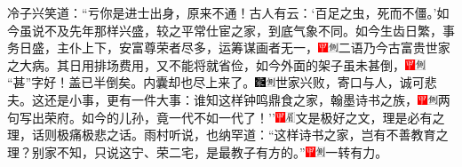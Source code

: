 {冷子兴笑道：``亏你是进士出身，原来不通！古人有云：`百足之虫，死而不僵。'如今虽说不及先年那样兴盛，较之平常仕宦之家，到底气象不同。如今生齿日繁，事务日盛，主仆上下，安富尊荣者尽多，运筹谋画者无一，{\includegraphics[width=3mm]{../Images/00002}\includegraphics[width=3mm]{../Images/00011}\footnotesize \kaishu 二语乃今古富贵世家之大病。}其日用排场费用，又不能将就省俭，如今外面的架子虽未甚倒，{\includegraphics[width=3mm]{../Images/00002}\includegraphics[width=3mm]{../Images/00011}\footnotesize \kaishu ``甚''字好！盖已半倒矣。}内囊却也尽上来了。{\includegraphics[width=3mm]{../Images/00006}\includegraphics[width=3mm]{../Images/00011}\footnotesize \kaishu 世家兴败，寄口与人，诚可悲夫。}这还是小事，更有一件大事：谁知这样钟鸣鼎食之家，翰墨诗书之族，{\includegraphics[width=3mm]{../Images/00002}\includegraphics[width=3mm]{../Images/00011}\footnotesize \kaishu 两句写出荣府。}如今的儿孙，竟一代不如一代了！''{\includegraphics[width=3mm]{../Images/00002}\includegraphics[width=3mm]{../Images/00010}\footnotesize \kaishu 文是极好之文，理是必有之理，话则极痛极悲之话。}雨村听说，也纳罕道：``这样诗书之家，岂有不善教育之理？别家不知，只说这宁、荣二宅，是最教子有方的。''{\includegraphics[width=3mm]{../Images/00002}\includegraphics[width=3mm]{../Images/00011}\footnotesize \kaishu 一转有力。}

}
